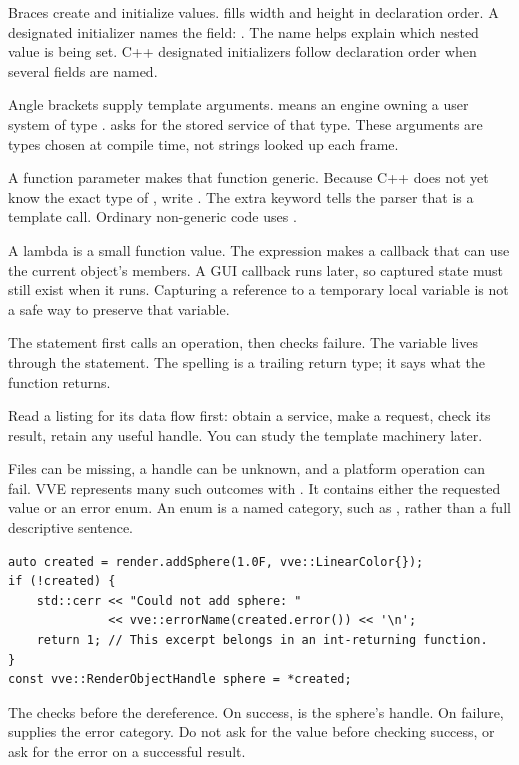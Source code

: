 \documentclass[11pt,a4paper]{article}
\begin{document}
Braces create and initialize values.  fills width and height in declaration order. A designated initializer names the field: . The name helps explain which nested value is being set. C++ designated initializers follow declaration order when several fields are named.

Angle brackets supply template arguments.  means an engine owning a user system of type .  asks for the stored service of that type. These arguments are types chosen at compile time, not strings looked up each frame.

A function parameter  makes that function generic. Because C++ does not yet know the exact type of , write . The extra keyword tells the parser that  is a template call. Ordinary non-generic code uses .

A lambda is a small function value. The expression  makes a callback that can use the current object's members. A GUI callback runs later, so captured state must still exist when it runs. Capturing a reference to a temporary local variable is not a safe way to preserve that variable.

The statement  first calls an operation, then checks failure. The variable lives through the  statement. The  spelling is a trailing return type; it says what the function returns.

\begin{remember}Read a listing for its data flow first: obtain a service, make a request, check its result, retain any useful handle. You can study the template machinery later.\end{remember}

Files can be missing, a handle can be unknown, and a platform operation can fail. VVE represents many such outcomes with . It contains either the requested value or an error enum. An enum is a named category, such as , rather than a full descriptive sentence.
\begin{lstlisting}
auto created = render.addSphere(1.0F, vve::LinearColor{});
if (!created) {
    std::cerr << "Could not add sphere: "
              << vve::errorName(created.error()) << '\n';
    return 1; // This excerpt belongs in an int-returning function.
}
const vve::RenderObjectHandle sphere = *created;
\end{lstlisting}
The  checks before the dereference. On success,  is the sphere's handle. On failure,  supplies the error category. Do not ask for the value before checking success, or ask for the error on a successful result.
\end{document}
